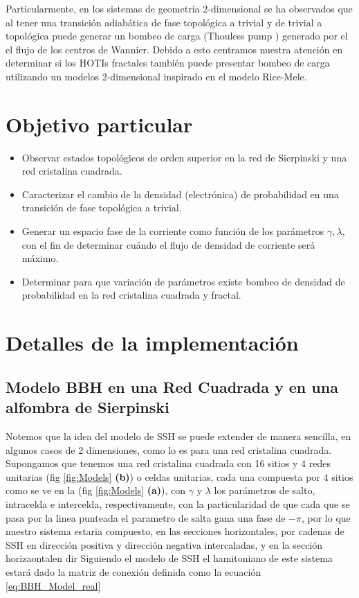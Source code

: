 Particularmente, en los sistemas de geometría 2-dimensional se ha observados que al tener una transición adiabática de fase topológica a trivial y de trivial a topológica puede generar un bombeo de carga (Thouless pump \cite{benalcazar2020higher}) generado por el el flujo de los centros de Wannier. Debido a esto centramos nuestra atención en determinar si los HOTIs fractales también puede presentar bombeo de carga utilizando un modelos 2-dimensional inspirado en el modelo Rice-Mele.
    
    \section{Objetivo particular}
    \begin{itemize}
        \item Observar estados topológicos de orden superior en la red de Sierpinski y una red cristalina cuadrada.
        \item Caracterizar el cambio de la densidad (electrónica) de probabilidad en una transición de fase topológica a trivial. 
        \item Generar un espacio fase de la corriente como función de los parámetros $\gamma, \lambda$, con el fin de determinar cuándo el flujo de densidad de corriente será máximo.
        \item Determinar para que variación de parámetros existe bombeo de densidad de probabilidad en la red cristalina cuadrada y fractal.
    \end{itemize}
    
\section{Detalles de la implementación}
    

\subsection{Modelo BBH en una Red Cuadrada y en una alfombra de Sierpinski}\label{Modelo_SSH_squara_and_Fractal}

    Notemos que la idea del modelo de SSH se puede extender de manera sencilla, en algunos casos de 2 dimensiones, como lo es para una red cristalina cuadrada. Supongamos que tenemos una red cristalina cuadrada con 16 sitios y 4 redes unitarias (fig \ref{fig:Models} \textbf{(b)}) o celdas unitarias, cada una compuesta por 4 sitios como se ve en la (fig \ref{fig:Models} \textbf{(a)}), con $\gamma$ y $\lambda$ los parámetros de salto, intracelda e intercelda, respectivamente, con la particularidad de que cada que se pasa por la linea punteada el parametro de salta gana una fase de $-\pi$, por lo que nuestro sistema estaria compuesto, en las secciones horizontales, por cadenas de SSH en dirección positiva y dirección negativa intercaladas, y en la sección horizaontalen dir Siguiendo el modelo de SSH el hamitoniano de este sistema estará dado la matriz de conexión definida como la ecuación \ref{eq:BBH_Model_real} 
    
